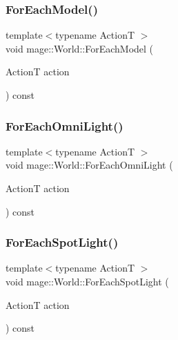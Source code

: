 \hypertarget{classmage_1_1_world_a8f9c130a358f6ce687d2948f477d4ef2}{}\label{classmage_1_1_world_a8f9c130a358f6ce687d2948f477d4ef2} 
\subsubsection{\texorpdfstring{For\+Each\+Model()}{ForEachModel()}}
{\footnotesize\ttfamily template$<$typename ActionT $>$ \\
void mage\+::\+World\+::\+For\+Each\+Model (\begin{DoxyParamCaption}\item[{ActionT}]{action }\end{DoxyParamCaption}) const\hspace{0.3cm}{\ttfamily [private]}}

\hypertarget{classmage_1_1_world_acd29a1806e15e3a8f923d3acbb90ac01}{}\label{classmage_1_1_world_acd29a1806e15e3a8f923d3acbb90ac01} 
\subsubsection{\texorpdfstring{For\+Each\+Omni\+Light()}{ForEachOmniLight()}}
{\footnotesize\ttfamily template$<$typename ActionT $>$ \\
void mage\+::\+World\+::\+For\+Each\+Omni\+Light (\begin{DoxyParamCaption}\item[{ActionT}]{action }\end{DoxyParamCaption}) const\hspace{0.3cm}{\ttfamily [private]}}

\hypertarget{classmage_1_1_world_ae82360b5ba2aa2fe947670f882607c9b}{}\label{classmage_1_1_world_ae82360b5ba2aa2fe947670f882607c9b} 
\subsubsection{\texorpdfstring{For\+Each\+Spot\+Light()}{ForEachSpotLight()}}
{\footnotesize\ttfamily template$<$typename ActionT $>$ \\
void mage\+::\+World\+::\+For\+Each\+Spot\+Light (\begin{DoxyParamCaption}\item[{ActionT}]{action }\end{DoxyParamCaption}) const\hspace{0.3cm}{\ttfamily [private]}}

